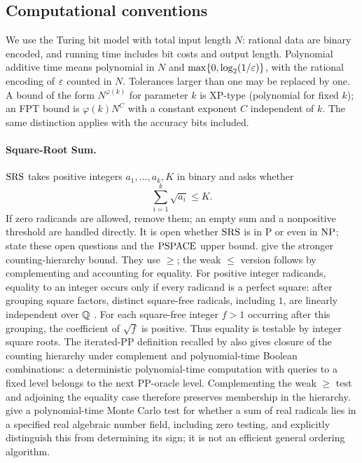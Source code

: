 \subsection{Computational conventions}
\label{subsec:a-pre-computation}
We use the Turing bit model with total input length $N$: rational data
are binary encoded, and running time includes bit costs and output
length. Polynomial additive time means polynomial in $N$ and
$\max\{0,\log_2(1/\varepsilon)\}$, with the rational encoding of $\varepsilon$ counted
in $N$. Tolerances larger than one may be replaced by one. A bound of
the form $N^{\varphi(k)}$ for parameter $k$ is XP-type (polynomial for fixed
$k$); an FPT bound is $\varphi(k)N^C$ with a constant exponent $C$ independent
of $k$. The same distinction applies with the accuracy bits included.

\paragraph{Square-Root Sum.}
$\mathrm{SRS}$ takes positive integers $a_1,\ldots,a_k,K$ in binary and asks
whether
\[
 \sum_{i=1}^k\sqrt{a_i}\le K.
\]
If zero radicands are allowed,
remove them; an empty sum and a nonpositive threshold are handled
directly. It is open whether $\mathrm{SRS}$ is in P or even in $\mathrm{NP}$;
\citet[Section 1]{etessami2010-on-the-complexity-of-nash} state these open
questions and the $\mathrm{PSPACE}$ upper bound.
\citet[Corollary 1.5]{allender2009-on-the-complexity-of-numerical}
give the stronger counting-hierarchy bound. They use $\ge$; the weak
$\le$ version follows by complementing and accounting for equality.
For positive integer radicands, equality to an integer
occurs only if every radicand is a perfect square: after grouping
square factors, distinct square-free radicals, including $1$, are
linearly independent over $\mathbb{Q}$
\citep[Section 2, Theorem 4]{blomer1991-computing-sums-of-radicals-in}.
For each square-free integer $f>1$ occurring after this grouping, the
coefficient of $\sqrt f$ is positive. Thus equality is testable by
integer square roots. The iterated-PP definition recalled by
\citet[Section 4, citing Wagner and Tor\'an]{allender2009-on-the-complexity-of-numerical}
also gives closure of the counting hierarchy under complement and
polynomial-time Boolean combinations: a deterministic polynomial-time
computation with queries to a fixed level belongs to the next PP-oracle
level. Complementing the weak $\ge$ test and adjoining the equality
case therefore preserves membership in the hierarchy.
\citet[Sections 1 and 7]{blomer1991-computing-sums-of-radicals-in}
give a polynomial-time Monte Carlo test for whether a sum of real
radicals lies in a specified real algebraic number field, including
zero testing, and explicitly distinguish this from determining its
sign; it is not an efficient general ordering algorithm.

